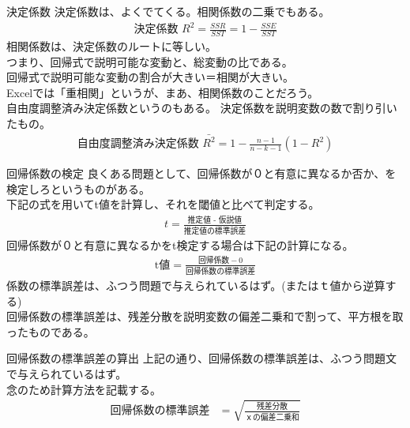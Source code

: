 \documentclass[dvipdfmx,autodetect-engine, unicode, 10pt, aspectratio=169]{beamer}
\begin{document}
 \begin{frame}{決定係数}
    決定係数は、よくでてくる。相関係数の二乗でもある。 \\
    \begin{align*}
        \text{決定係数 } R^2= \frac{SSR}{SST} = 1 - \frac{SSE}{SST}
    \end{align*}
    相関係数は、決定係数のルートに等しい。\\
    つまり、回帰式で説明可能な変動と、総変動の比である。\\
    回帰式で説明可能な変動の割合が大きい＝相関が大きい。\\
    Excelでは「重相関」というが、まあ、相関係数のことだろう。 \\
    自由度調整済み決定係数というのもある。 決定係数を説明変数の数で割り引いたもの。
    \begin{align*}
        \text{自由度調整済み決定係数 }\bar{R^2} = 1 - \frac{n-1}{n-k-1}\left(1-R^2\right)
    \end{align*}
\end{frame}

\begin{frame}{回帰係数の検定}
    良くある問題として、回帰係数が０と有意に異なるか否か、を検定しろというものがある。 \\
    下記の式を用いてt値を計算し、それを閾値と比べて判定する。
    \begin{align*}
        t = \frac{\text{推定値 - 仮説値}}{{\text{推定値の標準誤差}}}
    \end{align*}
    回帰係数が０と有意に異なるかをt検定する場合は下記の計算になる。
    \begin{align*}
        \text{t値} = \frac{\text{回帰係数} - 0}{\text{回帰係数の標準誤差}}
    \end{align*}
    係数の標準誤差は、ふつう問題で与えられているはず。(またはｔ値から逆算する) \\
    回帰係数の標準誤差は、残差分散を説明変数の偏差二乗和で割って、平方根を取ったものである。
    
\end{frame}

\begin{frame}{回帰係数の標準誤差の算出}
    上記の通り、回帰係数の標準誤差は、ふつう問題文で与えられているはず。\\
    念のため計算方法を記載する。\\
    \begin{align*}
        \text{回帰係数の標準誤差} &= \sqrt{\frac{\text{残差分散}}{{\text{ｘの偏差二乗和}}}} \\
    \end{align*}
\end{frame}
\end{document}
